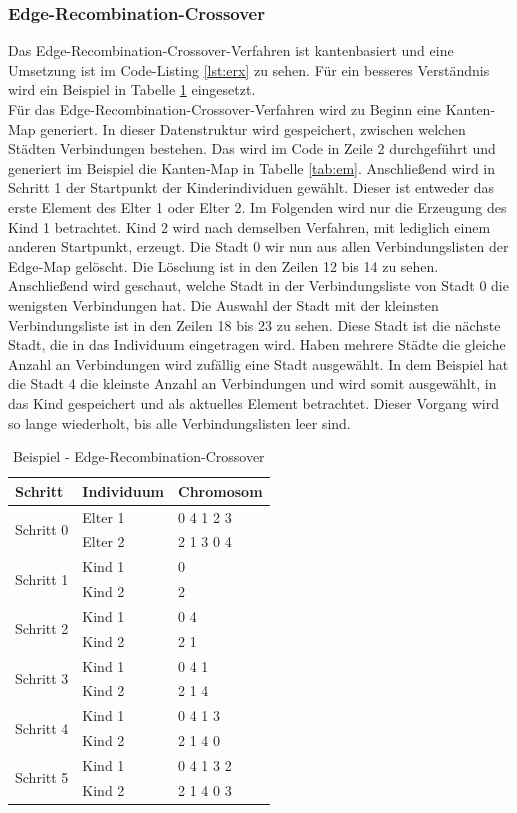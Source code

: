 \subsubsection{Edge-Recombination-Crossover}
Das Edge-Recombination-Crossover-Verfahren \cite[S. 276]{schoeneburg} ist kantenbasiert und eine Umsetzung ist im Code-Listing \ref{lst:erx} zu sehen. Für ein besseres Verständnis wird ein Beispiel in Tabelle \ref{tab:erx2} eingesetzt.\\
Für das Edge-Recombination-Crossover-Verfahren wird zu Beginn eine Kanten-Map generiert. In dieser Datenstruktur wird gespeichert, zwischen welchen Städten Verbindungen bestehen. Das wird im Code in Zeile 2 durchgeführt und generiert im Beispiel die Kanten-Map in Tabelle \ref{tab:em}.
Anschließend wird in Schritt 1 der Startpunkt der Kinderindividuen gewählt. Dieser ist entweder das erste Element des Elter 1 oder Elter 2. Im Folgenden wird nur die Erzeugung des Kind 1 betrachtet. Kind 2 wird nach demselben Verfahren, mit lediglich einem anderen Startpunkt, erzeugt.
Die Stadt 0 wir nun aus allen Verbindungslisten der Edge-Map gelöscht. Die Löschung ist in den Zeilen 12 bis 14 zu sehen. Anschließend wird geschaut, welche Stadt in der Verbindungsliste von Stadt 0 die wenigsten Verbindungen hat. Die Auswahl der Stadt mit der kleinsten Verbindungsliste ist in den Zeilen 18 bis 23 zu sehen. Diese Stadt ist die nächste Stadt, die in das Individuum eingetragen wird. Haben mehrere Städte die gleiche Anzahl an Verbindungen wird zufällig eine Stadt ausgewählt. In dem Beispiel hat die Stadt 4 die kleinste Anzahl an Verbindungen und wird somit ausgewählt, in das Kind gespeichert und als aktuelles Element betrachtet. Dieser Vorgang wird so lange wiederholt, bis alle Verbindungslisten leer sind.

\begin{table}[!htb]
\centering
\caption{Beispiel - Edge-Recombination-Crossover}
\begin{tabularx}{0.5\textwidth}{l|l|l}
Schritt & Individuum & Chromosom\\
\hline
\multirow{2}{*}{Schritt 0}
		& Elter 1 & 0 4 1 2 3\\
		& Elter 2 & 2 1 3 0 4\\
\hline
\multirow{2}{*}{Schritt 1}
		& Kind 1 & 0\\
		& Kind 2 & 2\\
\hline
\multirow{2}{*}{Schritt 2}
		& Kind 1 & 0 4 \\
		& Kind 2 & 2 1 \\
\hline
\multirow{2}{*}{Schritt 3}
		& Kind 1 & 0 4 1\\
		& Kind 2 & 2 1 4\\
\hline
\multirow{2}{*}{Schritt 4}
		& Kind 1 & 0 4 1 3\\
		& Kind 2 & 2 1 4 0\\
\hline
\multirow{2}{*}{Schritt 5}
		& Kind 1 & 0 4 1 3 2\\
		& Kind 2 & 2 1 4 0 3\\
\end{tabularx}
\label{tab:erx2}
\end{table}

